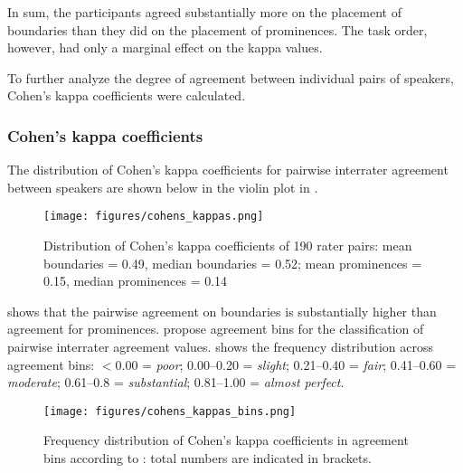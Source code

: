 In sum, the participants agreed substantially more on the placement of boundaries than they did on the placement of prominences. The task order, however, had only a marginal effect on the kappa values.

To further  analyze the degree of agreement between individual pairs of speakers,  Cohen's kappa coefficients were calculated.



\subsubsection{Cohen's kappa coefficients}
\label{sec:cohens-kappa-coefficients-and-z-normalized-scores}




The distribution of Cohen’s kappa coefficients for pairwise interrater agreement between speakers are shown below in the violin plot in   .





\begin{figure}
	\texttt{[image: figures/cohens\_kappas.png]}
	\caption{Distribution of Cohen's kappa coefficients of 190 rater pairs: mean boundaries = 0.49, median boundaries = 0.52; mean prominences = 0.15, median prominences = 0.14}
	\label{Distribution of Cohen's kappa coefficients}
\end{figure}

 shows that the pairwise agreement on boundaries is substantially higher than agreement for prominences. \citet[165]{landis1977measurement} propose agreement bins for the classification of pairwise interrater agreement values.    shows the frequency distribution across agreement bins: $<$0.00 = \textit{poor};  0.00--0.20 = \textit{slight}; 0.21--0.40 =  \textit{fair}; 0.41--0.60 = \textit{moderate}; 0.61--0.8 = \textit{substantial}; 0.81--1.00 = \textit{almost perfect}.


\begin{figure}
	\texttt{[image: figures/cohens\_kappas\_bins.png]}
	\caption{Frequency distribution of Cohen's kappa coefficients in
		agreement bins according to \citet[165]{landis1977measurement}: total numbers are indicated in brackets.}
	\label{Binned agreement TTL}
\end{figure}

